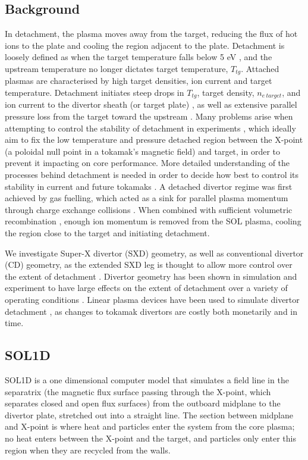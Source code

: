\documentclass[12pt]{article}  %
\providecommand{\Netarget}{$n_{e~target}$} %
\providecommand{\ttg}{$T_{tg}$} %
\begin{document}
\subsection{Background}\label{ssecBG}
In detachment, the plasma moves away from the target, reducing the flux of hot ions to the plate and cooling the region adjacent to the plate. Detachment is loosely defined as when the target temperature falls below 5 eV \cite{Porter1996}, and the upstream temperature no longer dictates target temperature, \ttg. Attached plasmas are characterised by high target densities, ion current and target temperature. Detachment initiates steep drops in \ttg, target density, \Netarget, and ion current to the divertor sheath (or target plate) \cite{Stacey2001}, as well as extensive parallel pressure loss from the target toward the upstream \cite{Nakazawa2000}. Many problems arise when attempting to control the stability of detachment in experiments \cite{Lipschultz2016}, which ideally aim to fix the low temperature and pressure detached region between the X-point (a poloidal null point in a tokamak's magnetic field) and target, in order to prevent it impacting on core performance. More detailed understanding of the processes behind detachment is needed in order to decide how best to control its stability in current and future tokamaks \cite{Reimold2015}. A detached divertor regime was first achieved by gas fuelling, which acted as a sink for parallel plasma momentum through charge exchange collisions \cite{Loarte1998}. When combined with sufficient volumetric recombination \cite{Wischmeier2009}, enough ion momentum is removed from the SOL plasma, cooling the region close to the target and initiating detachment. 

We investigate Super-X divertor (SXD) geometry, as well as conventional divertor (CD) geometry, as the extended SXD leg is thought to allow more control over the extent of detachment \cite{Valanju2009}. Divertor geometry has been shown in simulation and experiment to have large effects on the extent of detachment over a variety of operating conditions \cite{Pitts2001}. Linear plasma devices have been used to simulate divertor detachment \cite{Nishijima2002, Ohno2002}, as changes to tokamak divertors are costly both monetarily and in time.

\subsection{SOL1D}\label{ssecSOL1D}
SOL1D is a one dimensional computer model that simulates a field line in the separatrix (the magnetic flux surface passing through the X-point, which separates closed and open flux surfaces) from the outboard midplane to the divertor plate, stretched out into a straight line. The section between midplane and X-point is where heat and particles enter the system from the core plasma; no heat enters between the X-point and the target, and particles only enter this region when they are recycled from the walls.
\end{document}
